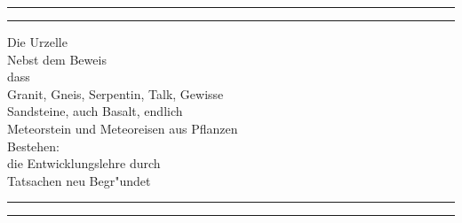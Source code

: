 \documentclass[a4paper, 11pt, oneside, german]{article}
\begin{document}
\swabfamily
\renewcommand{\contentsname}{
\swabfamily{Inhaltsverzeichnis}
}
\renewcommand{\listfigurename}{
\swabfamily{Abbildungsverzeichnis}
}
\let\origcftsecfont\cft
\let\origcftsecpagefont\cftsecpagefont
\let\origcftsecafterpnum\cftsecafterpnum
\renewcommand{\cftsecpagefont}{\swabfamily{\origcftsecpagefont}}
\renewcommand{\cftsecafterpnum}{\swabfamily{\origcftsecafterpnum}}
\let\origcftsubsecpagefont\cftsubsecpagefont
\let\origcftsubsecafterpnum\cftsubsecafterpnum
\renewcommand{\cftsubsecpagefont}{\swabfamily{\origcftsubsecpagefont}}
\renewcommand{\cftsubsecafterpnum}{\swabfamily{\origcftsubsecafterpnum}}
\begin{titlepage} %
	\centering %
	\scshape %

	
	\rule{\textwidth}{1.6pt}\vspace*{-\baselineskip}\vspace*{2pt} %
	\rule{\textwidth}{0.4pt} %
	
	\vspace{0.75\baselineskip} %
	
	{\Huge Die Urzelle\\}
	\vspace{0.75\baselineskip}
	{\Large Nebst dem Beweis\\ dass\\ Granit, Gneis, Serpentin, Talk, Gewisse\\ Sandsteine, auch Basalt, endlich\\ Meteorstein und Meteoreisen aus Pflanzen\\ Bestehen:\\ die Entwicklungslehre durch\\ Tatsachen neu Begr"undet\\} %
	
	\vspace{0.75\baselineskip} %
	
	\rule{\textwidth}{0.4pt}\vspace*{-\baselineskip}\vspace{3.2pt} %
	\rule{\textwidth}{1.6pt} %
	
	\vspace{1\baselineskip} %
	

\end{titlepage}
\end{document}
